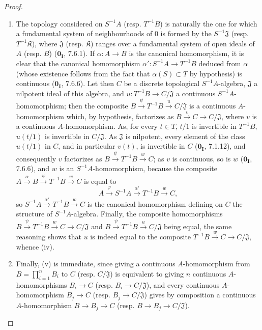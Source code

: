\begin{proof}
\begin{enumerate}
  \item[(iv)] The topology considered on $S^{-1}A$ (resp. $T^{-1}B$) is
  naturally the one for which a fundamental system of neighbourhoods of $0$
  is formed by the $S^{-1}\mathfrak{J}$ (resp. $T^{-1}\mathfrak K$), where
  $\mathfrak{J}$ (resp. $\mathfrak K$) ranges over a fundamental system of
  open ideals of $A$ (resp. $B$) ($\mathbf{0_I}$, 7.6.1). If
  $\alpha:A\to B$ is the canonical homomorphism, it is clear that the
  canonical homomorphism $\alpha':S^{-1}A\to T^{-1}B$ deduced from $\alpha$
  (whose existence follows from the fact that $\alpha(S)\subset T$ by
  hypothesis) is continuous ($\mathbf{0_I}$, 7.6.6). Let then $C$ be a
  discrete topological $S^{-1}A$-algebra, $\mathfrak{J}$ a nilpotent ideal of
  this algebra, and $u:T^{-1}B\to C/\mathfrak{J}$ a continuous
  $S^{-1}A$-homomorphism; then the composite
  $B\xrightarrow{\psi}T^{-1}B\xrightarrow{u}C/\mathfrak{J}$ is a continuous
  $A$-homomorphism which, by hypothesis, factorizes as
  $B\xrightarrow{v}C\to C/\mathfrak{J}$, where $v$ is a continuous
  $A$-homomorphism. As, for every $t\in T$, $t/1$ is invertible in $T^{-1}B$,
  $u(t/1)$ is invertible in $C/\mathfrak{J}$. As $\mathfrak{J}$ is nilpotent,
  every element of the class $u(t/1)$ in $C$, and in particular $v(t)$, is
  invertible in $C$ ($\mathbf{0_I}$, 7.1.12), and consequently $v$
  factorizes as $B\xrightarrow{\psi}T^{-1}B\xrightarrow{w}C$; as $v$ is
  continuous, so is $w$ ($\mathbf{0_I}$, 7.6.6), and $w$ is an
  $S^{-1}A$-homomorphism, because the composite
  $A\xrightarrow{\alpha}B\xrightarrow{\psi}T^{-1}B\xrightarrow{w}C$ is equal to
  \[
    A\xrightarrow{\varphi}S^{-1}A\xrightarrow{\alpha'}T^{-1}B\xrightarrow{w}C,
  \]
  so $S^{-1}A\xrightarrow{\alpha'}T^{-1}B\xrightarrow{w}C$ is the canonical
  homomorphism defining on $C$ the structure of $S^{-1}A$-algebra. Finally,
  the composite homomorphisms
  $B\xrightarrow{\psi}T^{-1}B\xrightarrow{w}C\to C/\mathfrak{J}$ and
  $B\xrightarrow{\psi}T^{-1}B\xrightarrow{u}C/\mathfrak{J}$ being equal, the
  same reasoning shows that $u$ is indeed equal to the composite
  $T^{-1}B\xrightarrow{w}C\to C/\mathfrak{J}$, whence (iv).

  \item[] Finally, (v) is immediate, since giving a continuous
  $A$-homomorphism from $B=\prod_{i=1}^n B_i$ to $C$ (resp. $C/\mathfrak{J}$)
  is equivalent to giving $n$ continuous $A$-homomorphisms $B_i\to C$
  (resp. $B_i\to C/\mathfrak{J}$), and every continuous $A$-homomorphism
  $B_j\to C$ (resp. $B_j\to C/\mathfrak{J}$) gives by composition a
  continuous $A$-homomorphism $B\to B_j\to C$
  (resp. $B\to B_j\to C/\mathfrak{J}$).
\end{enumerate}
\end{proof}

